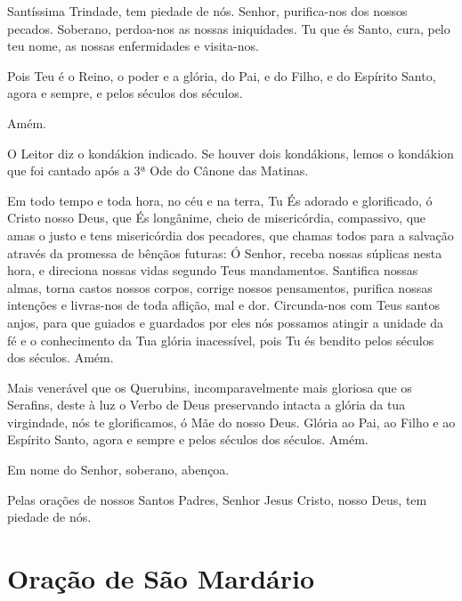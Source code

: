 \documentclass{subfiles}
\begin{document}
\trisagion{} \thrice{}

\Doxology{}

Santíssima Trindade, tem piedade de nós. Senhor, purifica-nos dos
nossos pecados. Soberano, perdoa-nos as nossas iniquidades. Tu que és Santo,
cura, pelo teu nome, as nossas enfermidades e visita-nos.

\mercy{} \thrice{}

\Doxology{}

\ourFather{}

\priest{}Pois Teu é o Reino, o poder e a glória, do Pai, e do Filho, e do
Espírito Santo, agora e sempre, e pelos séculos dos séculos.

\reader{}Amém.

O Leitor diz o kondákion indicado. Se houver dois kondákions, lemos o
kondákion que foi cantado após a 3ª Ode do Cânone das Matinas.

\mercy{} 

Em todo tempo e toda hora, no céu e na terra, Tu És adorado e
glorificado, ó Cristo nosso Deus, que És longânime, cheio de misericórdia,
compassivo, que amas o justo e tens misericórdia dos pecadores, que chamas
todos para a salvação através da promessa de bênçãos futuras: Ó Senhor,
receba nossas súplicas nesta hora, e direciona nossas vidas segundo Teus
mandamentos. Santifica nossas almas, torna castos nossos corpos, corrige
nossos pensamentos, purifica nossas intenções e livras-nos de toda aflição,
mal e dor. Circunda-nos com Teus santos anjos, para que guiados e guardados
por eles nós possamos atingir a unidade da fé e o conhecimento da Tua glória
inacessível, pois Tu és bendito pelos séculos dos séculos. Amém.

\mercy{} \thrice{}

\Doxology{}

Mais venerável que os Querubins, incomparavelmente mais gloriosa
que os Serafins, deste à luz o Verbo de Deus preservando intacta a glória da
tua virgindade, nós te glorificamos, ó Mãe do nosso Deus.
Glória ao Pai, ao Filho e ao Espírito Santo, agora e sempre e pelos
séculos dos séculos. Amém.

\mercy{} \thrice{}

Em nome do Senhor, soberano, abençoa.

\priest{}Pelas orações de nossos Santos Padres, Senhor Jesus Cristo,
nosso Deus, tem piedade de nós.

\section*{Oração de São Mardário}
\end{document}
